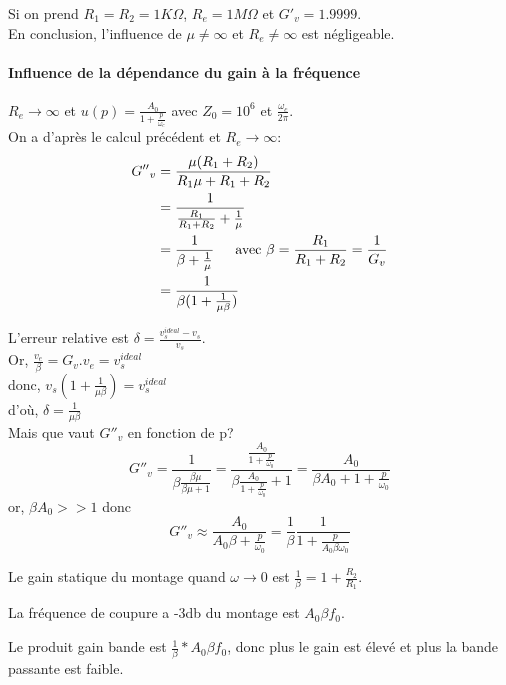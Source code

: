 \documentclass[../../Cours_M1.tex]{subfiles}
\begin{document}
Si on prend $R_1=R_2=1K\Omega$, $R_e=1M\Omega$ et ${G'}_v=1.9999$.\\
En conclusion, l'influence de $\mu \neq \infty$ et $R_e \neq \infty$ est négligeable.

\paragraph{Influence de la dépendance du gain à la fréquence} $R_e \rightarrow \infty$ et $u(p)=\frac{A_0}{1+\frac{p}{\omega_c}}$ avec $Z_0 = 10^6$ et $\frac{\omega_c}{2\pi}$.\\

On a d'après le calcul précédent et $R_e \rightarrow \infty$:\\
\begin{align*}
{G''}_v &= \frac{\mu(R_1+R_2)}{R_1\mu+R_1+R_2}\\
&=\frac{1}{\frac{R_1}{R_1+R_2}+\frac{1}{\mu}}\\
&= \frac{1}{\beta+\frac{1}{\mu}} \text{\indent avec }\beta=\frac{R_1}{R_1+R_2}=\frac{1}{G_v}\\
&=\frac{1}{\beta(1+\frac{1}{\mu\beta})}
\end{align*}

\noindent L'erreur relative est $\delta = \frac{v^{ideal}_s-v_s}{v_s}$.\\
Or, $\frac{v_e}{\beta}=G_v.v_e=v^{ideal}_s$\\
donc, $v_s(1+\frac{1}{\mu\beta})=v^{ideal}_s$\\
d'où, $\delta=\frac{1}{\mu\beta}$\\

Mais que vaut ${G''}_v$ en fonction de p?\\
\[{G''}_v = \frac{1}{\beta\frac{\beta\mu}{\beta\mu+1}} = \frac{\frac{A_0}{1+\frac{p}{\omega_0}}}{\beta\frac{A_0}{1+\frac{p}{\omega_0}}+1} = \frac{A_0}{\beta A_0+1+\frac{p}{\omega_0}}\]
or, $\beta A_0 >> 1$ donc 
\[{G''}_v \approx \frac{A_0}{A_0\beta+\frac{p}{\omega_0}}=\frac{1}{\beta}\frac{1}{1+\frac{p}{A_0\beta\omega_0}} \]

Le gain statique du montage quand $\omega \rightarrow 0$ est $\frac{1}{\beta}=1+\frac{R_2}{R_1}$.

La fréquence de coupure a -3db du montage est $A_0\beta f_0$.

Le produit gain bande est $\frac{1}{\beta}*A_0\beta f_0$, donc plus le gain est élevé et plus la bande passante est faible.
\bigbreak
\end{document}
